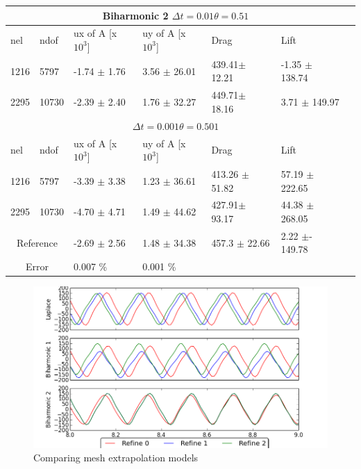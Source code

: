 \begin{table}[h!]
\centering
\label{my-label}
\begin{tabular}{ |p{1cm}||p{1cm}|p{2.5cm}|p{2.5cm}|p{2.7cm}|p{2.7cm}|p{1.2cm}|}
 \hline
  \multicolumn{6}{|c|}{Biharmonic 2 \hspace{2mm}  $\Delta t = 0.01 \theta = 0.51$} \\
   \hline
nel & ndof & ux of A [x $10^{3}$]  &uy of A [x $10^{3}$]& Drag  & Lift \\
 \hline
1216 &5797& -1.74  $\pm$  1.76 & 3.56 $\pm$  26.01 & 439.41$\pm$ 12.21  & -1.35    $\pm$  138.74\\
2295 &10730 & -2.39   $\pm$  2.40 &  1.76  $\pm$  32.27 & 449.71$\pm$ 18.16 &  3.71   $\pm$  149.97\\
 \hline
  \multicolumn{6}{|c|}{$\Delta t = 0.001 \theta = 0.501$} \\
   \hline
 nel & ndof & ux of A [x $10^{3}$]  &uy of A [x $10^{3}$]& Drag  & Lift \\
 1216 &5797& -3.39   $\pm$  3.38 &   1.23   $\pm$  36.61 &   413.26 $\pm$  51.82  &   57.19  $\pm$  222.65\\
 2295 &10730& -4.70  $\pm$  4.71& 1.49       $\pm$  44.62& 427.91$\pm$  93.17 &  44.38  $\pm$  268.05 \\
 \hline
 \multicolumn{2}{|c|}{Reference} & -2.69 $\pm$  2.56                    & 1.48  $\pm$  34.38                   & 457.3  $\pm$  22.66        & 2.22  $\pm$- 149.78           \\
 \hline
 \multicolumn{2}{|c|}{Error}  & 0.007 \%   & 0.001 \% & &\\
 \hline
\end{tabular}
\end{table}


\begin{figure}[h!]
    \includegraphics[scale=0.75]{./Fig/fsi3liftcompare.png}
      \caption{Comparing mesh extrapolation models}
\end{figure}

